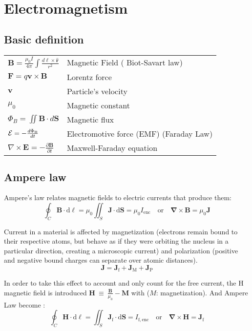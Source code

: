 \documentclass[twocolumn]{article}
\begin{document}
\section{Electromagnetism}
\subsection{Basic definition}
\begin{tabular}{@{}ll@{}}
$\mathbf{B} = \frac{\mu_0I}{4\pi}\int\frac{d\boldsymbol{\ell} \times \mathbf{\hat r}}{r^2}$ 	& Magnetic Field ( Biot-Savart law)\\
$\mathbf{F} = q \mathbf{v} \times \mathbf{B}$ 												& Lorentz force \\
$\mathbf{v}$ 																				& Particle's velocity \\
$\mu_0$																						& Magnetic constant\\
$\Phi_B = \iint\limits \mathbf{B} \cdot d \mathbf{S}$ 										& Magnetic flux\\
$\mathcal{E} = -{{d\Phi_\mathrm{B}} \over dt}$ 												& Electromotive force (EMF) (Faraday Law)\\
$\nabla \times \mathbf{E} = -\frac{\partial \mathbf{B}} {\partial t}$  						& Maxwell-Faraday equation \\
\end{tabular}

\subsection{Ampere law}
Ampere's law relates magnetic fields to electric currents that produce them:
\[ \oint_C \mathbf{B} \cdot \mathrm{d}\boldsymbol{\ell} = \mu_0 \iint_S \mathbf{J} \cdot \mathrm{d}\mathbf{S} = \mu_0I_\mathrm{enc}    \quad \text{or} \quad  \mathbf{\nabla} \times \mathbf{B} = \mu_0 \mathbf{J} \]

Current in a material is affected by magnetization (electrons remain bound to their respective atoms, but behave as if they were orbiting the nucleus in a particular direction, creating a microscopic current) and polarization (positive and negative bound charges can separate over atomic distances).
\[\mathbf{J} =\mathbf{J}_{\text{f}} + \mathbf{J}_{\text{M}} + \mathbf{J}_{\text{P}} \]

In order to take this effect to account and only count for the free current, the H magnetic field is introduced $\mathbf{H}\  \equiv \ \frac{\mathbf{B}}{\mu_0}-\mathbf{M}$ with ($M$: magnetization). And Ampere Law become :
\[\oint_C \mathbf{H} \cdot \mathrm{d}\boldsymbol{\ell} = \iint_S \mathbf{J}_\mathrm{f}\cdot \mathrm{d}\mathbf{S} = I_{\mathrm{f,enc}}     \quad  \text{or} \quad\mathbf{\nabla} \times \mathbf{H} = \mathbf{J}_{\text{f}} \]
\end{document}
